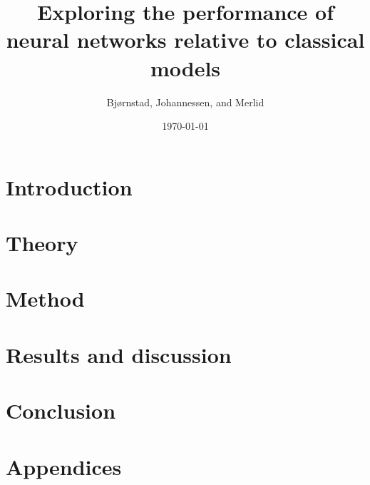 \documentclass[aps,rmp,reprint,amsmath,amssymb,twocolumn,floatfix]{revtex4-1}
\begin{document}
\title{Exploring the performance of neural networks relative to classical models}

\author{Bjørnstad, Johannessen, and Merlid}
\date{\today}


\begin{abstract}

\end{abstract}
\maketitle

\tableofcontents

\section{Introduction}
\label{sec:introduction}

\section{Theory}


\section{Method}


\section{Results and discussion}


%

\section{Conclusion}


\clearpage
{} %

\newpage
\appendix
\section{Appendices}
\label{appendix}

\end{document}

